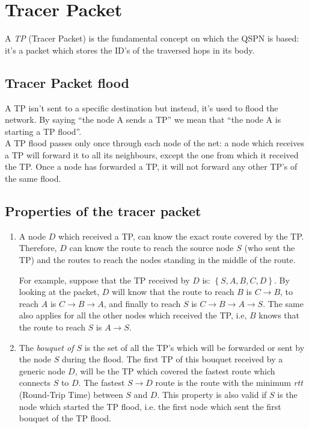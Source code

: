 \documentclass[a4paper]{article}
\begin{document}
\section{Tracer Packet}
\label{sec:TP}

A \emph{TP} (Tracer Packet) is the fundamental concept on which the QSPN is
based: it's a packet which stores the ID's of the traversed hops in its body.

\subsection{Tracer Packet flood}
\label{sec:TP_flood}

A TP isn't sent to a specific destination but instead, it's used to flood the
network. By saying ``the node A sends a TP'' we mean that ``the node A is
starting a TP flood''.\\

A TP flood passes only once through each node of the net: a node which
receives a TP will forward it to all its neighbours, except the one from which
it received the TP. Once a node has forwarded a TP, it will not forward any
other TP's of the same flood.

\subsection{Properties of the tracer packet}
\label{sec:proprieties_TP}

\begin{enumerate}
	\item A node $D$ which received a TP, can know the exact route covered
		by the TP. Therefore, $D$ can know the route to reach the
		source node $S$ (who sent the TP) and the routes to reach
		the nodes standing in the middle of the route.

		For example, suppose that the TP received by $D$ is: $\left\{
		S, A, B, C, D \right\}$. By looking at the packet, $D$ will
		know that the route to reach $B$ is $C\rightarrow B$, to reach $A$ is
		$C\rightarrow B\rightarrow A$, and finally to reach $S$ is
		$C\rightarrow B\rightarrow A\rightarrow S$.
		The same also applies for all the other nodes which received
		the TP, i.e, $B$ knows that the route to reach $S$ is
		$A\rightarrow S$.
	\item The \emph{bouquet of $S$} is the set of all the TP's which will
		be forwarded or sent by the node $S$ during the flood.
		The first TP of this bouquet received by a generic node $D$,
		will be the TP which covered the fastest route which connects
		$S$ to $D$.
		The fastest $S \rightarrow D$ route is the route with the
		minimum \emph{rtt} (Round-Trip Time) between $S$ and $D$.
		This property is also valid if $S$ is the node which started
		the TP flood, i.e. the first node which sent the first bouquet
		of the TP flood.
\end{enumerate}
\end{document}
